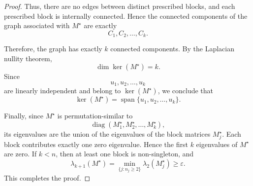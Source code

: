 \documentclass[10pt,a4paper]{amsart}
\begin{document}
\begin{proof}
	Thus, there are no edges between distinct prescribed blocks, and each prescribed block is internally connected. Hence the connected components of the graph associated with $M^\star$ are exactly
	\[
	C_1,C_2,\ldots,C_k.
	\]
	
	Therefore, the graph has exactly $k$ connected components. By the Laplacian nullity theorem,
	\[
	\dim\ker(M^\star)=k.
	\]
	Since
	\[
	u_1,u_2,\ldots,u_k
	\]
	are linearly independent and belong to $\ker(M^\star)$, we conclude that
	\[
	\ker(M^\star)
	=
	\operatorname{span}\{u_1,u_2,\ldots,u_k\}.
	\]
	
	Finally, since $M^\star$ is permutation-similar to
	\[
	\operatorname{diag}(M^\star_1,M^\star_2,\ldots,M^\star_k),
	\]
	its eigenvalues are the union of the eigenvalues of the block matrices $M^\star_j$. Each block contributes exactly one zero eigenvalue. Hence the first $k$ eigenvalues of $M^\star$ are zero. If $k<n$, then at least one block is non-singleton, and
	\[
	\lambda_{k+1}(M^\star)
	=
	\min_{\{j:n_j\ge2\}}\lambda_2(M^\star_j)
	\ge
	\varepsilon.
	\]
	This completes the proof.
\end{proof}
\end{document}
